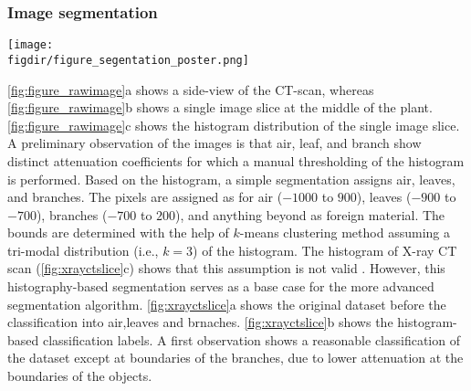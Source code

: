 \subsubsection*{Image segmentation}


\begin{sidewaysfigure}[p]
	\centering
	\texttt{[image: \\figdir/figure\_segentation\_poster.png]}
	\caption{Segmentation of the X-ray CT scan:  slice of original X-ray CT dataset,  segmentation using user-defined histogram threshold and  segmentation using Trainable WEKA Segmentation and additional morphological operation (opening + closing). Only a sub-region of an image slice is shown for clarity. The segmented pixels are labeled as air ($0$, purple), leaf ($1$, blue) and branch ($2$, yellow).}
	\label{fig:xrayctslice}
\end{sidewaysfigure}

\cref{fig:figure_rawimage}a shows a side-view of the CT-scan, whereas \cref{fig:figure_rawimage}b shows a single image slice at the middle of the plant. \cref{fig:figure_rawimage}c shows the histogram distribution of the single image slice. A preliminary observation of the images is that air, leaf, and branch show distinct attenuation coefficients for which a manual thresholding of the histogram is performed. Based on the histogram, a simple segmentation assigns air, leaves, and branches. The pixels are assigned as for air ($-1000$ to $900$), leaves ($-900$ to $-700$), branches ($-700$ to $200$), and anything beyond as foreign material. The bounds are determined with the help of $k$-means clustering method assuming a tri-modal distribution (i.e., $k=3$) of the histogram. The histogram of X-ray CT scan (\cref{fig:xrayctslice}c) shows that this assumption is not valid . However, this histography-based segmentation serves as a base case for the more advanced segmentation algorithm. \cref{fig:xrayctslice}a shows the original dataset before the classification into air,leaves and brnaches. \cref{fig:xrayctslice}b shows the histogram-based classification labels. A first observation shows a reasonable classification of the dataset except at boundaries of the branches, due to lower attenuation at the boundaries of the objects.


